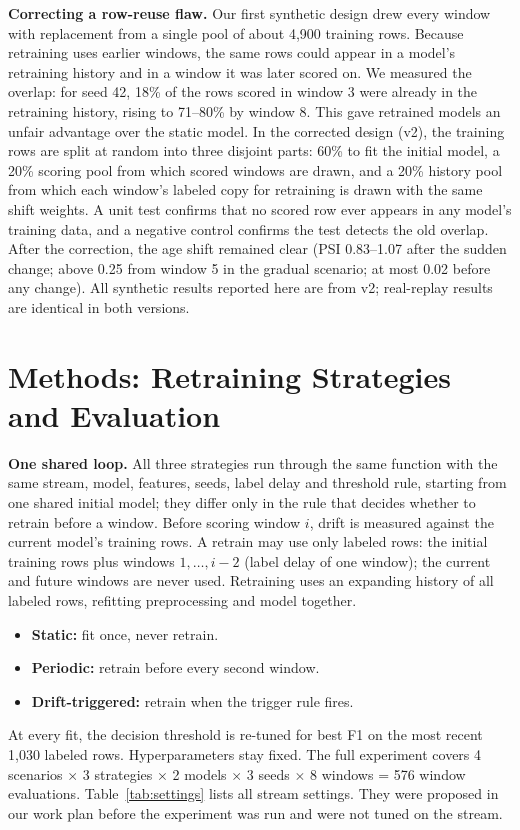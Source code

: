 \documentclass[conference]{IEEEtran}
\begin{document}
\textbf{Correcting a row-reuse flaw.} Our first synthetic design drew every window with replacement from a single pool of about 4,900 training rows. Because retraining uses earlier windows, the same rows could appear in a model's retraining history and in a window it was later scored on. We measured the overlap: for seed 42, 18\% of the rows scored in window 3 were already in the retraining history, rising to 71--80\% by window 8. This gave retrained models an unfair advantage over the static model. In the corrected design (v2), the training rows are split at random into three disjoint parts: 60\% to fit the initial model, a 20\% scoring pool from which scored windows are drawn, and a 20\% history pool from which each window's labeled copy for retraining is drawn with the same shift weights. A unit test confirms that no scored row ever appears in any model's training data, and a negative control confirms the test detects the old overlap. After the correction, the age shift remained clear (PSI 0.83--1.07 after the sudden change; above 0.25 from window 5 in the gradual scenario; at most 0.02 before any change). All synthetic results reported here are from v2; real-replay results are identical in both versions.

\section{Methods: Retraining Strategies and Evaluation}
\label{sec:strategies}

\textbf{One shared loop.} All three strategies run through the same function with the same stream, model, features, seeds, label delay and threshold rule, starting from one shared initial model; they differ only in the rule that decides whether to retrain before a window. Before scoring window $i$, drift is measured against the current model's training rows. A retrain may use only labeled rows: the initial training rows plus windows $1,\dots,i-2$ (label delay of one window); the current and future windows are never used. Retraining uses an expanding history of all labeled rows, refitting preprocessing and model together.
\begin{itemize}
\item \textbf{Static:} fit once, never retrain.
\item \textbf{Periodic:} retrain before every second window.
\item \textbf{Drift-triggered:} retrain when the trigger rule fires.
\end{itemize}
At every fit, the decision threshold is re-tuned for best F1 on the most recent 1,030 labeled rows. Hyperparameters stay fixed. The full experiment covers 4 scenarios $\times$ 3 strategies $\times$ 2 models $\times$ 3 seeds $\times$ 8 windows = 576 window evaluations. Table~\ref{tab:settings} lists all stream settings. They were proposed in our work plan before the experiment was run and were not tuned on the stream.
\end{document}
